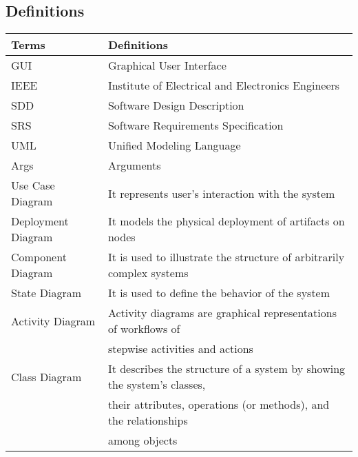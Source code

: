 \newpage

\begin{center}
\section{Definitions}
\end{center}

\begin{tabular}{|l|l|}
  \hline
  \textbf{Terms} & \textbf{Definitions} \\
  \hline
  GUI & Graphical User Interface  \\
  \hline
  IEEE & Institute of Electrical and Electronics Engineers \\
   \hline
  SDD & Software Design Description \\
  \hline
  SRS & Software Requirements Specification  \\
  \hline
  UML & Unified Modeling Language \\
  \hline
  Args & Arguments \\
  \hline
  Use Case Diagram & It represents user's interaction with the system \\
  \hline
  Deployment Diagram & It models the physical deployment of artifacts on nodes \\
  \hline
  Component Diagram & It is used to illustrate the structure of arbitrarily complex systems \\
  \hline
  State Diagram & It is used to define the behavior of the system \\
  \hline
  Activity Diagram & Activity diagrams are graphical representations of workflows of \\
   & stepwise activities and actions \\
  \hline
  Class Diagram & It describes the structure of a system by showing the system's classes,\\
   & their attributes, operations (or methods), and the relationships\\
   & among objects \\
  \hline
\end{tabular}
